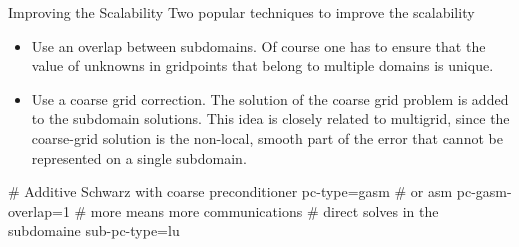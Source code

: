 



\begin{frame}[fragile]{Improving the Scalability}
  Two popular techniques to improve the scalability
  \begin{itemize}
  \item Use an overlap between subdomains. Of course one has to
ensure that the value of unknowns in gridpoints that belong
to multiple domains is unique.
\item Use a coarse grid correction. The solution of the coarse grid
problem is added to the subdomain solutions.
This idea is closely related to multigrid, since the coarse-grid
solution is the non-local, smooth part of the error that cannot
be represented on a single subdomain.

  \end{itemize}

\begin{bashcode}
  # Additive Schwarz with coarse preconditioner
  pc-type=gasm # or asm
  pc-gasm-overlap=1 # more means more communications
  # direct solves in the subdomaine
  sub-pc-type=lu
\end{bashcode}

\end{frame}
